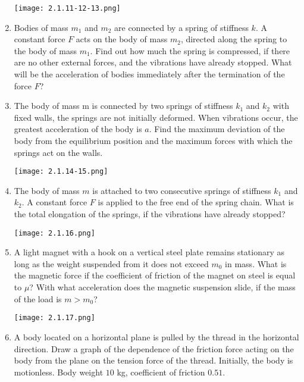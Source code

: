\documentclass{article}
\begin{document}
\begin{enumerate}[label=2.1.\arabic*]
\begin{center}
    \texttt{[image: 2.1.11-12-13.png]}
\end{center}

\item Bodies of mass $m_1$ and $m_2$ are connected by a spring of stiffness $k$. A constant force $F$ acts on the body of mass $m_2$, directed along the spring to the body of mass $m_1$. Find out how much the spring is compressed, if there are no other external forces, and the vibrations have already stopped. What will be the acceleration of bodies immediately after the termination of the force $F$?

\item The body of mass m is connected by two springs of stiffness $k_1$ and $k_2$ with fixed walls, the springs are not initially deformed. When vibrations occur, the greatest acceleration of the body is $a$. Find the maximum deviation of the body from the equilibrium position and the maximum forces with which the springs act on the walls.

\begin{center}
    \texttt{[image: 2.1.14-15.png]}
\end{center}

\item The body of mass $m$ is attached to two consecutive springs of stiffness $k_1$ and $k_2$. A constant force $F$ is applied to the free end of the spring chain. What is the total elongation of the springs, if the vibrations have already stopped?

\begin{center}
    \texttt{[image: 2.1.16.png]}
\end{center}

\item A light magnet with a hook on a vertical steel plate remains stationary as long as the weight suspended from it does not exceed $m_0$ in mass. What is the magnetic force if the coefficient of friction of the magnet on steel is equal to $\mu$? With what acceleration does the magnetic suspension slide, if the mass of the load is $m > m_0$?

\begin{center}
    \texttt{[image: 2.1.17.png]}
\end{center}

\item A body located on a horizontal plane is pulled by the thread in the horizontal direction. Draw a graph of the dependence of the friction force acting on the body from the plane on the tension force of the thread. Initially, the body is motionless. Body weight $10$ kg, coefficient of friction $0.51$.


\end{enumerate}
\end{document}
